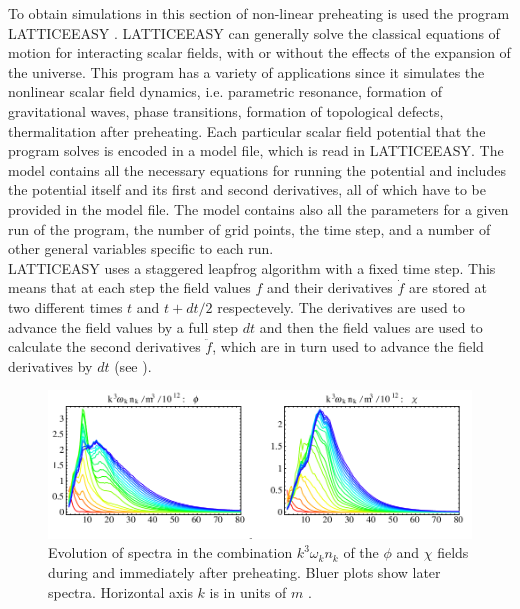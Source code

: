 \documentclass[11pt,a4paper,twoside]{book}
\begin{document}
To obtain simulations in this section of non-linear preheating is used the program LATTICEEASY \cite{Chap5:Latticeeasy}. LATTICEEASY can generally solve the classical equations of motion for interacting scalar fields, with or without the effects of the expansion of the universe. This program has a variety of applications since it simulates the nonlinear scalar field dynamics, i.e. parametric resonance, formation of gravitational waves, phase transitions, formation of topological defects, thermalitation after preheating. Each particular scalar field potential that the program solves is encoded in a model file, which is read in LATTICEEASY. The model contains all the necessary equations for running the potential and includes the potential itself and its first and second derivatives, all of which have to be provided in the model file. The model contains also all the parameters for a given run of the program, the number of grid points, the time step, and a number of other general variables specific to each run.\\
 LATTICEASY uses a staggered leapfrog algorithm with a fixed time step. This means that at each step the field values $ f $ and their derivatives $\dot{f}$ are stored at two different times $ t $ and $ t + dt/2 $ respectevely. The derivatives are used to advance the field values by a full step $ dt $ and then the field values are used to calculate the second derivatives $\ddot{f}$, which are in turn used to advance the field derivatives by $ dt$ (see \cite{Chap5:Latticeeasy}).\\
 \begin{figure}
 	\centering
 	\includegraphics[width=0.8\linewidth, height=0.3\textheight]{Images/Chap5/Fragmentation_Fig1}
 	\caption{Evolution of spectra in the combination $ k^{3}\omega_{k}n_{k} $ of the $\phi$ and $\chi$ fields during and immediately after preheating. Bluer plots show later spectra. Horizontal axis $ k $ is in units of $ m $ \cite{Chap5:Fragmentation}.}
 	\label{fig:fragmentationfig1}
 \end{figure}
\end{document}
